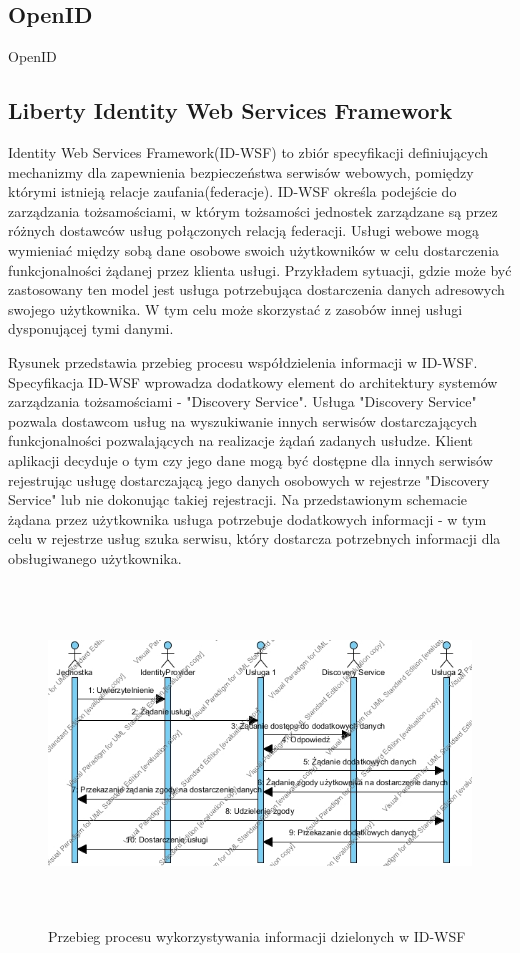 \subsection{OpenID}

OpenID

\subsection{Liberty Identity Web Services Framework}

	Identity Web Services Framework(ID-WSF) to zbiór specyfikacji definiujących mechanizmy dla zapewnienia bezpieczeństwa serwisów webowych, pomiędzy którymi istnieją relacje zaufania(federacje)\cite{Oracle10}. ID-WSF określa podejście do zarządzania tożsamościami, w którym tożsamości jednostek zarządzane są przez różnych dostawców usług połączonych relacją federacji. Usługi webowe mogą wymieniać między sobą dane osobowe swoich użytkowników w celu dostarczenia funkcjonalności żądanej przez klienta usługi. Przykładem sytuacji, gdzie może być zastosowany ten model jest usługa potrzebująca dostarczenia danych adresowych swojego użytkownika. W tym celu może skorzystać z zasobów innej usługi 
	dysponującej tymi danymi.

	Rysunek przedstawia przebieg procesu współdzielenia informacji w ID-WSF. Specyfikacja ID-WSF wprowadza dodatkowy element do architektury systemów zarządzania tożsamościami - "Discovery Service". Usługa "Discovery Service" pozwala dostawcom usług na wyszukiwanie innych serwisów dostarczających funkcjonalności pozwalających na realizacje żądań zadanych usłudze. Klient aplikacji decyduje o tym czy jego dane mogą być dostępne dla innych serwisów rejestrując usługę dostarczającą jego danych osobowych w rejestrze "Discovery Service" lub nie dokonując takiej rejestracji. Na przedstawionym schemacie żądana przez użytkownika usługa potrzebuje dodatkowych informacji - w tym celu w rejestrze usług szuka serwisu, który dostarcza potrzebnych informacji dla obsługiwanego użytkownika.

	\begin{figure}[h]
		\centering
			\includegraphics[width=15cm,height=9cm]{img/id-wsf.jpg}
		\caption{Przebieg procesu wykorzystywania informacji dzielonych w ID-WSF}
		\label{Przebieg procesu wykorzystywania informacji dzielonych w ID-WSF}
	\end{figure}

